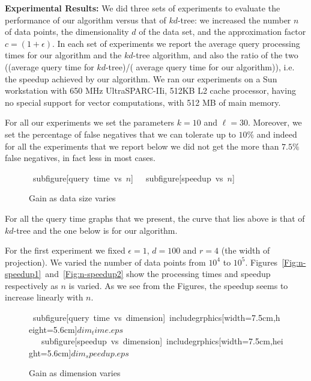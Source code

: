 \documentclass[12pt]{article}
\begin{document}
{\bf Experimental Results:} We did three sets of experiments to evaluate
the performance of our algorithm versus that of $kd$-tree: we
increased the number $n$ of data points, the dimensionality $d$ of the data
set, and the approximation factor $c=(1+ \epsilon)$. In each set of
experiments we report the average query processing times for our
algorithm and the $kd$-tree algorithm, and also the ratio of the two
((average query time for $kd$-tree)/( average query time for our
algorithm)), i.e. the speedup achieved by our algorithm.  We ran our
experiments on a Sun workstation with 650 MHz UltraSPARC-IIi, 512KB L2
cache processor, having no special support for vector computations, with
512 MB of main memory.


 For all our experiments we set the parameters $k=10$ and $\ell =
30$. Moreover, we set the percentage of false negatives that we can
tolerate up to $10\%$ and indeed for all the experiments that we report
below we did not get the more than $7.5\%$ false negatives, in fact less
in most cases.



\begin{figure}[t]
\begin{center}
\mbox{
subfigure[query time vs $n$]{
\label{Fig:n-speedup1}
} \quad
subfigure[speedup vs $n$]{
\label{Fig:n-speedup2}
}
}
\caption{Gain as data size varies}
\label{Fig:n-speedup}
\end{center}
\end{figure}

For all the query time graphs that we present, the curve that lies above
is that of $kd$-tree and the one below is for our algorithm.

For the first experiment we fixed $\epsilon = 1$, $d = 100$
and $r = 4$ (the width of projection).  We varied the number of data points from $10^4$ to
$10^5$. Figures~\ref{Fig:n-speedup1}~and~\ref{Fig:n-speedup2} show
the processing times and speedup respectively as $n$ is varied. As
we see from the Figures, the speedup seems to increase linearly
with $n$.

\begin{figure}[t]
\begin{center}
\mbox{
subfigure[query time vs dimension]{
includegrphics[width=7.5cm,height=5.6cm]{$dim_time.eps$}
\label{Fig:dim-speedup1}
} \quad
subfigure[speedup vs dimension]{
includegrphics[width=7.5cm,height=5.6cm]{$dim_speedup.eps$}
\label{Fig:dim-speedup2}
}
}
\caption{Gain as dimension varies}
\label{Fig:dim-speedup}
\end{center}
\end{figure}
\end{document}
